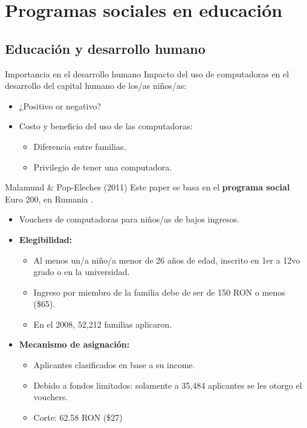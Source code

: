 \documentclass[11pt, aspectratio=169, compress]{beamer}
\begin{document}
\section{Programas sociales en educación}
\subsection{Educación y desarrollo humano}
\begin{frame}[t]{Importancia en el desarrollo humano}
Impacto del uso de computadoras en el desarrollo del capital humano de los/as niños/as: 
\begin{itemize}
	\item ¿Positivo or negativo? 
	\item Costo y beneficio del uso de las computadoras: 
	\begin{itemize}
		\item Diferencia entre familias. 
		\item Privilegio de tener una computadora. 
	\end{itemize}
\end{itemize}
\end{frame}
\begin{frame}[t]{Malamund \& Pop-Eleches (2011)}
Este paper se basa en el \textbf{programa social} Euro 200, en Rumania . 
\begin{itemize}
	\item Vouchers de computadoras para niños/as de bajos ingresos. 
	\item \textbf{Elegibilidad: }
	\begin{itemize}
		\item Al menos un/a niño/a menor de 26 años de edad, inscrito en 1er a 12vo grado o en la universidad. 
		\item Ingreso por miembro de la familia debe de ser de 150 RON o menos (\$65). 
		\item En el 2008, 52,212 familias aplicaron. 
	\end{itemize}
	\item \textbf{Mecanismo de asignación:} 
	\begin{itemize}
		\item Aplicantes clasificados en base a su income. 
		\item Debido a fondos limitados: solamente a 35,484 aplicantes se les otorgo el vouchers. 
		\item Corte: 62.58 RON (\$27)
	\end{itemize}
\end{itemize}
\end{frame}
\end{document}
